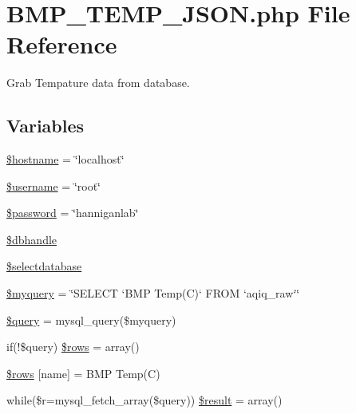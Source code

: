 \hypertarget{_b_m_p___t_e_m_p___j_s_o_n_8php}{}\section{B\+M\+P\+\_\+\+T\+E\+M\+P\+\_\+\+J\+S\+O\+N.\+php File Reference}
\label{_b_m_p___t_e_m_p___j_s_o_n_8php}


Grab Tempature data from database.  


\subsection*{Variables}
\begin{DoxyCompactItemize}
\item 
\hyperlink{_b_m_p___t_e_m_p___j_s_o_n_8php_a8bf9ffb42ed554b203b55377d1fc9aa4}{\$hostname} = \char`\"{}localhost\char`\"{}
\item 
\hyperlink{_b_m_p___t_e_m_p___j_s_o_n_8php_a0eb82aa5f81cf845de4b36cd653c42cf}{\$username} = \char`\"{}root\char`\"{}
\item 
\hyperlink{_b_m_p___t_e_m_p___j_s_o_n_8php_a607686ef9f99ea7c42f4f3dd3dbb2b0d}{\$password} = \char`\"{}hanniganlab\char`\"{}
\item 
\hyperlink{_b_m_p___t_e_m_p___j_s_o_n_8php_a013f690a9cf598d1498e72aa8aa8a8d2}{\$dbhandle}
\item 
\hyperlink{_b_m_p___t_e_m_p___j_s_o_n_8php_a3a00cb9dd022e8ab0cdfe17aad984a14}{\$selectdatabase}
\item 
\hyperlink{_b_m_p___t_e_m_p___j_s_o_n_8php_a8ff37acfddb2efb7962bb94d1c6d0d1c}{\$myquery} = \char`\"{}S\+E\+L\+E\+CT `B\+MP Temp(C)` F\+R\+OM `aqiq\+\_\+raw`\char`\"{}
\item 
\hyperlink{_b_m_p___t_e_m_p___j_s_o_n_8php_af59a5f7cd609e592c41dc3643efd3c98}{\$query} = mysql\+\_\+query(\$myquery)
\item 
if(!\$query) \hyperlink{_b_m_p___t_e_m_p___j_s_o_n_8php_a9d560e904e6665a6ee21f86a65c1ef8e}{\$rows} = array()
\item 
\hyperlink{_b_m_p___t_e_m_p___j_s_o_n_8php_a6384d385f2f9c3f6bcad27ed87e67106}{\$rows} \mbox{[}\textquotesingle{}name\textquotesingle{}\mbox{]} = \textquotesingle{}B\+MP Temp(C)\textquotesingle{}
\item 
while(\$r=mysql\+\_\+fetch\+\_\+array(\$query)) \hyperlink{_b_m_p___t_e_m_p___j_s_o_n_8php_a9148136d1e11f768be4f805d7e567da2}{\$result} = array()
\end{DoxyCompactItemize}


